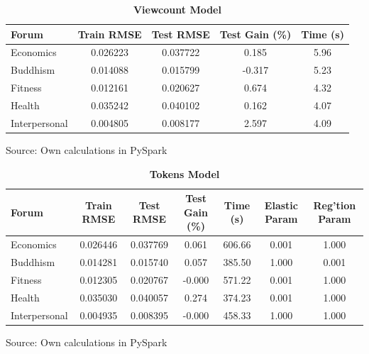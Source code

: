 \documentclass[11pt,preprint, authoryear]{article}
\numberwithin{equation}{section}
\numberwithin{figure}{section}
\begin{document}
\begin{longtable}[htbp] {@{} lcccc @{}} 
\caption{\textbf{Viewcount Model}} 
\label{tab:vc_model} \\
\hline \hline
\textbf{Forum} &  \textbf{Train RMSE} &  \textbf{Test RMSE} &  \textbf{Test Gain (\%)} &  \textbf{Time (s)} \\
\hline \hline
Economics     &             0.026223 &          0.037722 &              0.185 &               5.96 \\
Buddhism      &             0.014088 &          0.015799 &             -0.317 &               5.23 \\
Fitness       &             0.012161 &          0.020627 &              0.674 &               4.32 \\
Health        &             0.035242 &          0.040102 &              0.162 &               4.07 \\
Interpersonal &             0.004805 &          0.008177 &              2.597 &               4.09 \\
\hline \hline
\end{longtable}\begin{center} Source: Own calculations in PySpark\end{center}

\normalsize

\footnotesize

\begin{longtable}[htbp] {@{} lcccccc @{}} 
\caption{\textbf{Tokens Model}} 
\label{tab:vc_model} \\
\hline \hline
\textbf{Forum} &  \textbf{Train RMSE} &  \textbf{Test RMSE} &  \textbf{Test Gain (\%)} &  \textbf{Time (s)} & \textbf{Elastic Param} &  \textbf{Reg'tion Param} \\
\hline \hline
Economics     &          0.026446 &       0.037769 &           0.061 &          606.66 &             0.001 &             1.000 \\
Buddhism      &          0.014281 &       0.015740 &           0.057 &          385.50 &             1.000 &             0.001 \\
Fitness       &          0.012305 &       0.020767 &          -0.000 &          571.22 &             0.001 &             1.000 \\
Health        &          0.035030 &       0.040057 &           0.274 &          374.23 &             0.001 &             1.000 \\
Interpersonal &          0.004935 &       0.008395 &          -0.000 &          458.33 &             1.000 &             1.000 \\
\hline \hline
\end{longtable}\begin{center} Source: Own calculations in PySpark\end{center}
\end{document}
